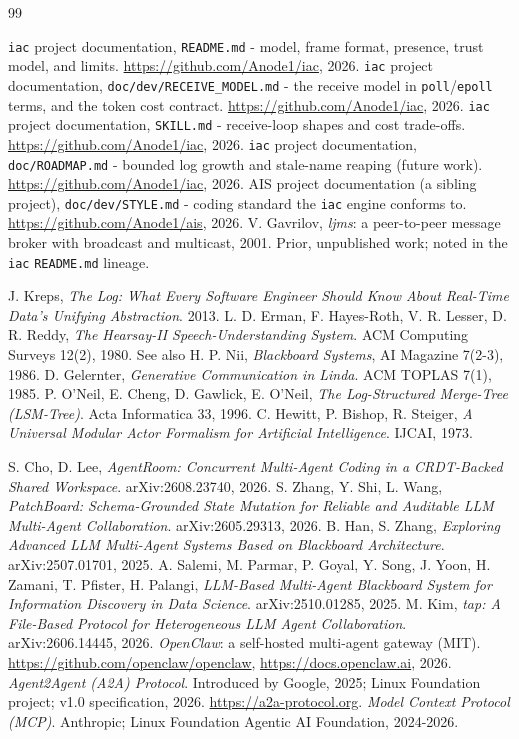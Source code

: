\documentclass[11pt]{article}
\newcommand{\code}[1]{\texttt{#1}}
\begin{document}
\begin{thebibliography}{99}

 \code{iac} project documentation, \code{README.md} - model, frame format, presence, trust model, and limits. \url{https://github.com/Anode1/iac}, 2026.
 \code{iac} project documentation, \code{doc/dev/RECEIVE\_MODEL.md} - the receive model in \code{poll}/\code{epoll} terms, and the token cost contract. \url{https://github.com/Anode1/iac}, 2026.
 \code{iac} project documentation, \code{SKILL.md} - receive-loop shapes and cost trade-offs. \url{https://github.com/Anode1/iac}, 2026.
 \code{iac} project documentation, \code{doc/ROADMAP.md} - bounded log growth and stale-name reaping (future work). \url{https://github.com/Anode1/iac}, 2026.
 AIS project documentation (a sibling project), \code{doc/dev/STYLE.md} - coding standard the \code{iac} engine conforms to. \url{https://github.com/Anode1/ais}, 2026.
 V. Gavrilov, \emph{ljms}: a peer-to-peer message broker with broadcast and multicast, 2001. Prior, unpublished work; noted in the \code{iac} \code{README.md} lineage.

 J. Kreps, \emph{The Log: What Every Software Engineer Should Know About Real-Time Data's Unifying Abstraction}. 2013.
 L. D. Erman, F. Hayes-Roth, V. R. Lesser, D. R. Reddy, \emph{The Hearsay-II Speech-Understanding System}. ACM Computing Surveys 12(2), 1980. See also H. P. Nii, \emph{Blackboard Systems}, AI Magazine 7(2-3), 1986.
 D. Gelernter, \emph{Generative Communication in Linda}. ACM TOPLAS 7(1), 1985.
 P. O'Neil, E. Cheng, D. Gawlick, E. O'Neil, \emph{The Log-Structured Merge-Tree (LSM-Tree)}. Acta Informatica 33, 1996.
 C. Hewitt, P. Bishop, R. Steiger, \emph{A Universal Modular Actor Formalism for Artificial Intelligence}. IJCAI, 1973.

 S. Cho, D. Lee, \emph{AgentRoom: Concurrent Multi-Agent Coding in a CRDT-Backed Shared Workspace}. arXiv:2608.23740, 2026.
 S. Zhang, Y. Shi, L. Wang, \emph{PatchBoard: Schema-Grounded State Mutation for Reliable and Auditable LLM Multi-Agent Collaboration}. arXiv:2605.29313, 2026.
 B. Han, S. Zhang, \emph{Exploring Advanced LLM Multi-Agent Systems Based on Blackboard Architecture}. arXiv:2507.01701, 2025.
 A. Salemi, M. Parmar, P. Goyal, Y. Song, J. Yoon, H. Zamani, T. Pfister, H. Palangi, \emph{LLM-Based Multi-Agent Blackboard System for Information Discovery in Data Science}. arXiv:2510.01285, 2025.
 M. Kim, \emph{tap: A File-Based Protocol for Heterogeneous LLM Agent Collaboration}. arXiv:2606.14445, 2026.
 \emph{OpenClaw}: a self-hosted multi-agent gateway (MIT). \url{https://github.com/openclaw/openclaw}, \url{https://docs.openclaw.ai}, 2026.
 \emph{Agent2Agent (A2A) Protocol}. Introduced by Google, 2025; Linux Foundation project; v1.0 specification, 2026. \url{https://a2a-protocol.org}.
 \emph{Model Context Protocol (MCP)}. Anthropic; Linux Foundation Agentic AI Foundation, 2024-2026.


\end{thebibliography}
\end{document}
